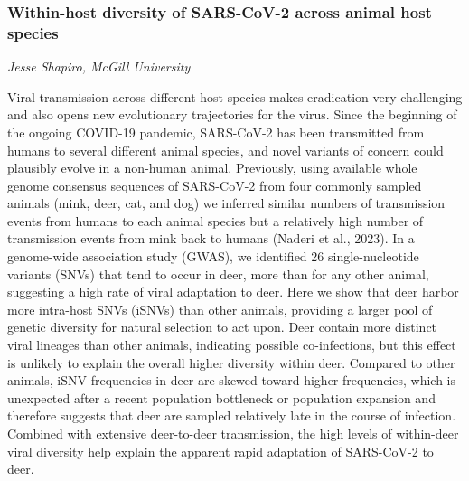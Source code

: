 
\subsubsection*{Within-host diversity of SARS-CoV-2 across animal host
species}
\textit{Jesse Shapiro, McGill University}

Viral transmission across different host species makes eradication very challenging and also opens new evolutionary trajectories for the virus. Since the beginning of the ongoing COVID-19 pandemic, SARS-CoV-2 has been transmitted from humans to several different animal species, and novel variants of concern could plausibly evolve in a non-human animal. Previously, using available whole genome consensus sequences of SARS-CoV-2 from four commonly sampled animals (mink, deer, cat, and dog) we inferred similar numbers of transmission events from humans to each animal species but a relatively high number of transmission events from mink back to humans (Naderi et al., 2023). In a genome-wide association study (GWAS), we identified 26 single-nucleotide variants (SNVs) that tend to occur in deer, more than for any other animal, suggesting a high rate of viral adaptation to deer. Here we show that deer harbor more intra-host SNVs (iSNVs) than other animals, providing a larger pool of genetic diversity for natural selection to act upon. Deer contain more distinct viral lineages than other animals, indicating possible co-infections, but this effect is unlikely to explain the overall higher diversity within deer. Compared to other animals, iSNV frequencies in deer are skewed toward higher frequencies, which is unexpected after a recent population bottleneck or population expansion and therefore suggests that deer are sampled relatively late in the course of infection. Combined with extensive deer-to-deer transmission, the high levels of within-deer viral diversity help explain the apparent rapid adaptation of SARS-CoV-2 to deer.
